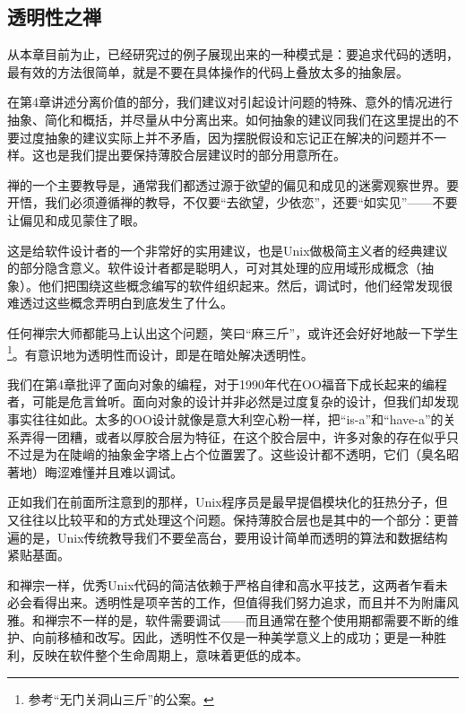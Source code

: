 \documentclass[12pt,oneside]{book}
\begin{document}
\begin{common-format}
\subsection{透明性之禅}
从本章目前为止，已经研究过的例子展现出来的一种模式是：要追求代码的透明，最有效的方法很简单，就是不要在具体操作的代码上叠放太多的抽象层。

在第4章讲述分离价值的部分，我们建议对引起设计问题的特殊、意外的情况进行抽象、简化和概括，并尽量从中分离出来。如何抽象的建议同我们在这里提出的不要过度抽象的建议实际上并不矛盾，因为摆脱假设和忘记正在解决的问题并不一样。这也是我们提出要保持薄胶合层建议时的部分用意所在。

禅的一个主要教导是，通常我们都透过源于欲望的偏见和成见的迷雾观察世界。要开悟，我们必须遵循禅的教导，不仅要“去欲望，少依恋”，还要“如实见”——不要让偏见和成见蒙住了眼。

这是给软件设计者的一个非常好的实用建议，也是Unix做极简主义者的经典建议的部分隐含意义。软件设计者都是聪明人，可对其处理的应用域形成概念（抽象）。他们把围绕这些概念编写的软件组织起来。然后，调试时，他们经常发现很难透过这些概念弄明白到底发生了什么。

任何禅宗大师都能马上认出这个问题，笑曰“麻三斤”，或许还会好好地敲一下学生\footnote{参考“无门关洞山三斤”的公案\cite{Mumon}。}。有意识地为透明性而设计，即是在暗处解决透明性。

我们在第4章批评了面向对象的编程，对于1990年代在OO福音下成长起来的编程者，可能是危言耸听。面向对象的设计并非必然是过度复杂的设计，但我们却发现事实往往如此。太多的OO设计就像是意大利空心粉一样，把“is-a”和“have-a”的关系弄得一团糟，或者以厚胶合层为特征，在这个胶合层中，许多对象的存在似乎只不过是为在陡峭的抽象金字塔上占个位置罢了。这些设计都不透明，它们（臭名昭著地）晦涩难懂并且难以调试。

正如我们在前面所注意到的那样，Unix程序员是最早提倡模块化的狂热分子，但又往往以比较平和的方式处理这个问题。保持薄胶合层也是其中的一个部分：更普遍的是，Unix传统教导我们不要垒高台，要用设计简单而透明的算法和数据结构紧贴基面。

和禅宗一样，优秀Unix代码的简洁依赖于严格自律和高水平技艺，这两者乍看未必会看得出来。透明性是项辛苦的工作，但值得我们努力追求，而且并不为附庸风雅。和禅宗不一样的是，软件需要调试——而且通常在整个使用期都需要不断的维护、向前移植和改写。因此，透明性不仅是一种美学意义上的成功；更是一种胜利，反映在软件整个生命周期上，意味着更低的成本。



\end{common-format}
\end{document}

